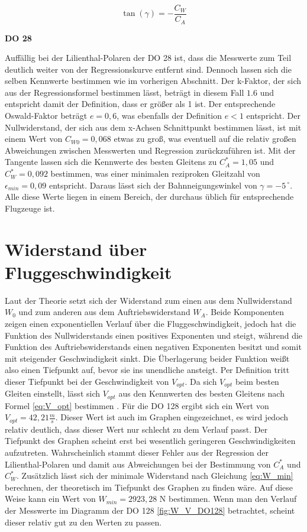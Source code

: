 \begin{equation}
\tan\left(\gamma\right)=-\frac{C_W}{C_A}
\label{eq:Bahn}
\end{equation}

\textbf{DO 28}

Auffällig bei der Lilienthal-Polaren der DO 28 ist, dass die Messwerte zum Teil deutlich weiter von der Regressionskurve entfernt sind. Dennoch lassen sich die selben Kennwerte bestimmen wie im vorherigen Abschnitt. 
Der k-Faktor, der sich aus der Regressionsformel bestimmen lässt, beträgt in diesem Fall $1.6$ und entspricht damit der Definition, dass er größer als 1 ist. Der entsprechende Oswald-Faktor beträgt $e = 0,6$, was ebenfalls der Definition $e<1$ entspricht. 
Der Nullwiderstand, der sich aus dem x-Achsen Schnittpunkt bestimmen lässt, ist mit einem Wert von $C_{W0} = 0,068$ etwas zu groß, was eventuell auf die relativ großen Abweichungen zwischen Messwerten und Regression zurückzuführen ist.
Mit der Tangente lassen sich die Kennwerte des besten Gleitens zu $C_A^* = 1,05$ und $C_W^* = 0,092$ bestimmen, was einer minimalen reziproken Gleitzahl von $\epsilon_{min} = 0,09$ entspricht. Daraus lässt sich der Bahnneigungswinkel von $\gamma = -5^{\ \circ}$. Alle diese Werte liegen in einem Bereich, der durchaus üblich für entsprechende Flugzeuge ist.


\section{Widerstand über Fluggeschwindigkeit}
Laut der Theorie setzt sich der Widerstand zum einen aus dem Nullwiderstand $W_0$ und zum anderen aus dem Auftriebswiderstand $W_A$. Beide Komponenten zeigen einen exponentiellen Verlauf über die Fluggeschwindigkeit, jedoch hat die Funktion des Nullwiderstands einen positives Exponenten und steigt, während die Funktion des Auftriebswiderstands einen negativen Exponenten besitzt und somit mit steigender Geschwindigkeit sinkt. Die Überlagerung beider Funktion weißt also einen Tiefpunkt auf, bevor sie ins unendliche ansteigt. Per Definition tritt dieser Tiefpunkt bei der Geschwindigkeit von $V_{opt}$. Da sich $V_{opt}$ beim besten Gleiten einstellt, lässt sich $V_{opt}$ aus den Kennwerten des besten Gleitens nach Formel \ref{eq:V_opt} bestimmen \cite{Skript}. Für die DO 128 ergibt sich ein Wert von $V_{opt} = 42,21 \frac{m}{s}$. Dieser Wert ist auch im Graphen eingezeichnet, es wird jedoch relativ deutlich, dass dieser Wert nur schlecht zu dem Verlauf passt. Der Tiefpunkt des Graphen scheint erst bei wesentlich geringeren Geschwindigkeiten aufzutreten. Wahrscheinlich stammt dieser Fehler aus der Regression der Lilienthal-Polaren und damit aus Abweichungen bei der Bestimmung von $C_A^*$ und $C_W^*$. Zusätzlich lässt sich der minimale Widerstand nach Gleichung \ref{eq:W_min} berechnen, der theoretisch im Tiefpunkt des Graphen zu finden wäre. Auf diese Weise kann ein Wert von $W_{min} = 2923,28$ N bestimmen. Wenn man den Verlauf der Messwerte im Diagramm der DO 128 \ref{fig:W_V_DO128} betrachtet, scheint dieser relativ gut zu den Werten zu passen.

